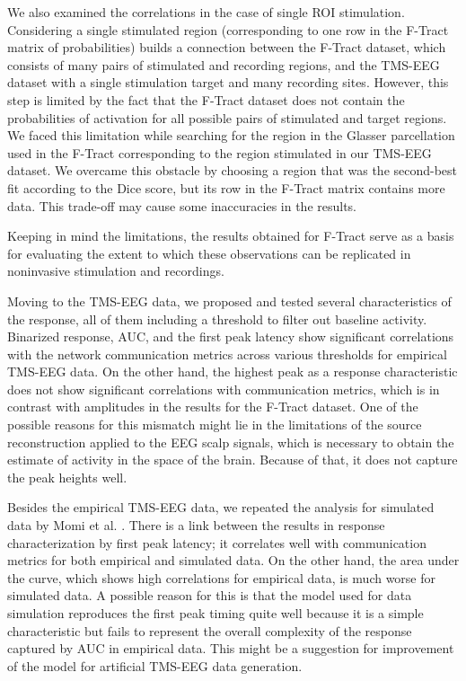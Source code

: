 We also examined the correlations in the case of single ROI stimulation. Considering a single stimulated region (corresponding to one row in the F-Tract matrix of probabilities) builds a connection between the F-Tract dataset, which consists of many pairs of stimulated and recording regions, and the TMS-EEG dataset with a single stimulation target and many recording sites. However, this step is limited by the fact that the F-Tract dataset does not contain the probabilities of activation for all possible pairs of stimulated and target regions. We faced this limitation while searching for the region in the Glasser parcellation used in the F-Tract corresponding to the region stimulated in our TMS-EEG dataset. We overcame this obstacle by choosing a region that was the second-best fit according to the Dice score, but its row in the F-Tract matrix contains more data. This trade-off may cause some inaccuracies in the results.

Keeping in mind the limitations, the results obtained for F-Tract serve as a basis for evaluating the extent to which these observations can be replicated in noninvasive stimulation and recordings. 

Moving to the TMS-EEG data, we proposed and tested several characteristics of the response, all of them including a threshold to filter out baseline activity. Binarized response, AUC, and the first peak latency show significant correlations with the network communication metrics across various thresholds for empirical TMS-EEG data. On the other hand, the highest peak as a response characteristic does not show significant correlations with communication metrics, which is in contrast with amplitudes in the results for the F-Tract dataset. One of the possible reasons for this mismatch might lie in the limitations of the source reconstruction applied to the EEG scalp signals, which is necessary to obtain the estimate of activity in the space of the brain. Because of that, it does not capture the peak heights well.

Besides the empirical TMS-EEG data, we repeated the analysis for simulated data by Momi et al. \cite{momi_tms-evoked_2023}. There is a link between the results in response characterization by first peak latency; it correlates well with communication metrics for both empirical and simulated data. On the other hand, the area under the curve, which shows high correlations for empirical data, is much worse for simulated data. A possible reason for this is that the model used for data simulation reproduces the first peak timing quite well because it is a simple characteristic but fails to represent the overall complexity of the response captured by AUC in empirical data. This might be a suggestion for improvement of the model for artificial TMS-EEG data generation.

